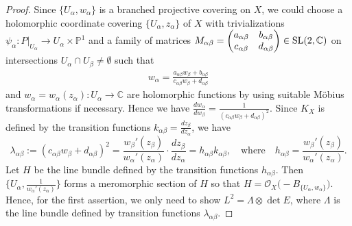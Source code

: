 \documentclass[12pt]{article}
\begin{document}
\begin{proof} Since $\{U_{\alpha}, w_{\alpha}\}$ is a branched projective covering on $X$, we could choose a holomorphic coordinate covering  $\{U_{\alpha}, z_{\alpha}\}$  of $X$ with trivializations $\psi_{\alpha}\colon P|_{U_{\alpha}} \rightarrow U_{\alpha} \times \mathbb{P}^1$ and a family of matrices
$M_{\alpha\beta} = \begin{pmatrix}
   a_{\alpha\beta} & b_{\alpha\beta} \\
   c_{\alpha\beta} & d_{\alpha\beta}
\end{pmatrix} \in {\rm SL(2, \mathbb{C})}$ on intersections $U_{\alpha} \cap U_{\beta}\not=\emptyset$ such that
\begin{align}
\label{wtransition}
  w_{\alpha} = \frac{a_{\alpha\beta}w_{\beta} + b_{\alpha\beta}}{c_{\alpha\beta}w_{\beta} + d_{\alpha\beta}}
\end{align}
and $w_\alpha=w_{\alpha}(z_{\alpha})\colon U_\alpha\to {\mathbb C}$ are holomorphic functions by using suitable M{\" o}bius transformations if necessary. Hence we have
$\frac{dw_{\alpha}}{dw_{\beta}} = \frac{1}{(c_{\alpha\beta}w_{\beta}+d_{\alpha\beta})^2}$.
Since $K_X$ is defined by the transition functions
$k_{\alpha\beta} = \frac{dz_{\beta}}{dz_{\alpha}}$,
we have
\[ \lambda_{\alpha\beta} := (c_{\alpha\beta}w_{\beta}+d_{\alpha\beta})^2 = \frac{w_{\beta}'(z_{\beta})} {w_{\alpha}'(z_{\alpha})} \cdot \frac{dz_{\beta}}{dz_{\alpha}} = h_{\alpha\beta}k_{\alpha\beta}, \quad \text{where}\quad
h_{\alpha\beta} = \frac{w_{\beta}'(z_{\beta})} {w_{\alpha}'(z_{\alpha})}.\]
Let $H$ be the line bundle defined by the transition functions $h_{\alpha\beta}$. Then
$\{U_{\alpha}, \frac{1}{w_{\alpha}'(z_{\alpha})}\}$ forms a meromorphic section of $H$ so that
$H = \mathcal{O}_{X}\big(-B_{\{U_{\alpha}, w_{\alpha}\}}\big)$. Hence, for the first assertion, we only need to show $L^{2} = \Lambda \otimes \det E$, where $\Lambda$ is the line bundle defined by transition functions $\lambda_{\alpha \beta}$.


\end{proof}
\end{document}
